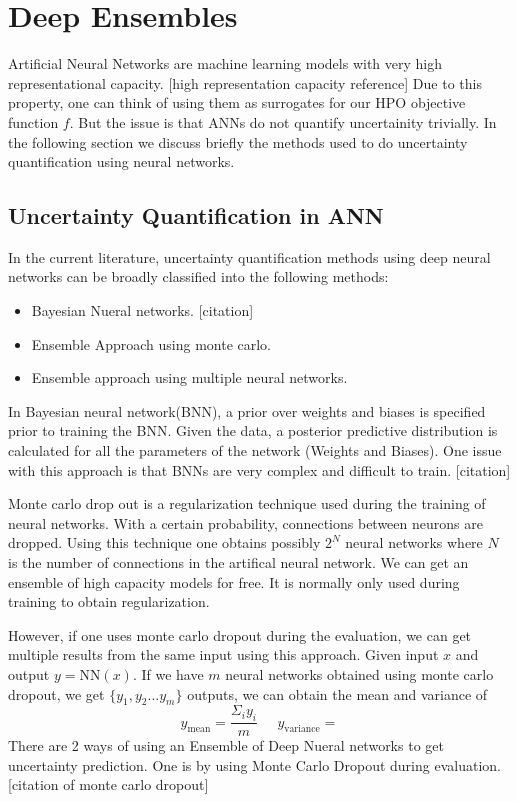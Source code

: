 \documentclass[11pt]{report}
\begin{document}
\section{Deep Ensembles}

Artificial Neural Networks are machine learning models with very high representational capacity.
[high representation capacity reference]
Due to this property,  one can think of using them as surrogates for our HPO objective function $f$.
But the issue is that ANNs do not quantify uncertainity trivially.
In the following section we discuss briefly the methods used to do uncertainty quantification using neural networks.

\subsection{Uncertainty Quantification in ANN}

In the current literature,  uncertainty quantification methods using deep neural networks can be broadly classified into the following methods:
\begin{itemize}
\item Bayesian Nueral networks. [citation]
\item Ensemble Approach using monte carlo.
\item Ensemble approach using multiple neural networks.
\end{itemize}

In Bayesian neural network(BNN),  a prior over weights and biases is specified prior to training the BNN.
Given the data,  a posterior predictive distribution is calculated for all the parameters of the network (Weights and Biases).
One issue with this approach is that BNNs are very complex and difficult to train.  [citation]

Monte carlo drop out is a regularization technique used during the training of neural networks.
With a certain probability,  connections between neurons are dropped.
Using this technique one obtains possibly $2^N$ neural networks where $N$ is the number of connections
in the artifical neural network.
We can get an ensemble of high capacity models for free.
It is normally only used during training to obtain regularization.

However,  if one uses monte carlo dropout during the evaluation,  we can get multiple results from the same input using this approach.
Given input $x$ and output $y = \textrm{NN}(x)$.  If we have $m$ neural networks obtained using monte carlo dropout,  we get $\{y_1, y_2... y_m\}$ outputs,  we can obtain the mean and variance of 
$$
y_\textrm{mean} = \frac{\Sigma_i y_i}{m}  \;\;\;\;\;  y_\textrm{variance} = 
$$
There are 2 ways of using an Ensemble of Deep Nueral networks to get uncertainty prediction.
One is by using Monte Carlo Dropout during evaluation. [citation of monte carlo dropout]
\end{document}

